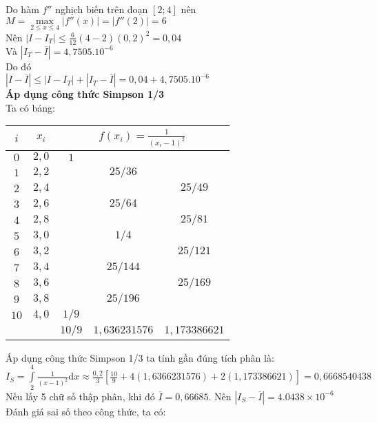 Do hàm $f''$ nghịch biến trên đoạn $\left[2;4\right]$ nên $ M= \underset{2\leq x \leq 4}{\max}\left|f''\left(x\right)\right| = \left|f''\left(2\right)\right|=6$ \\
Nên $\left| I - I_T\right| \leq \frac{6}{12} \left(4-2\right)\left(0,2\right)^2= 0,04$\\
Và $\left|I_T- \overline{I} \right| = 4,7505.10^{-6}$\\
Do đó\\
$\left| I - \overline{I} \right| \leq \left|I - I_T\right| + \left|I_T - \overline{I}\right| = 0,04 + 4,7505.10^{-6}$\\
\textbf{Áp dụng công thức Simpson 1/3}\\
Ta có bảng:\\
\begin{center}\begin{tabular}{|c|c|c|c|c|}
	\hline
	$i$ & $x_i$ & \multicolumn{3}{|c|}{$f\left(x_i\right)=\frac{1}{\left(x_i - 1 \right)^2}$}\\ \hline
	$0$ & $2,0$ & $1$ & &\\ \hline
	$1$ & $2,2$ & & $25/36$ &\\ \hline
	$2$ & $2,4$ & & & $25/49$ \\ \hline
	$3$ & $2,6$ & & $25/64$ & \\ \hline
	$4$ & $2,8$ & & & $25/81$ \\ \hline
	$5$ & $3,0$ & & $1/4$ & \\ \hline
	$6$ & $3,2$ & & & $25/121$ \\ \hline
	$7$ & $3,4$ & & $25/144$ &\\ \hline
	$8$ & $3,6$ & & & $25/169$ \\ \hline
	$9$ & $3,8$ & & $25/196$ & \\ \hline
	$10$ & $4,0$ & $1/9$ & & \\ \hline
	& & $10/9$ & $1,636231576$ & $1,173386621$ \\ \hline
\end{tabular}\end{center}
Áp dụng công thức Simpson 1/3 ta tính gần đúng tích phân là:\\
$I_S=\int\limits^{4}_{2} \frac{1}{\left(x-1\right)^2}\mathrm{d}x \approx \frac{0,2}{3} \left[ \frac{10}{9} + 4\left(1,6366231576\right)+ 2\left(1,173386621\right) \right]=0,6668540438$\\
Nếu lấy 5 chữ số thập phân, khi đó $\overline{I}=0,66685$. Nên $\left| I_S - \overline{I} \right| = 4.0438\times 10^{-6}$\\
Đánh giá sai số theo công thức, ta có:\\
